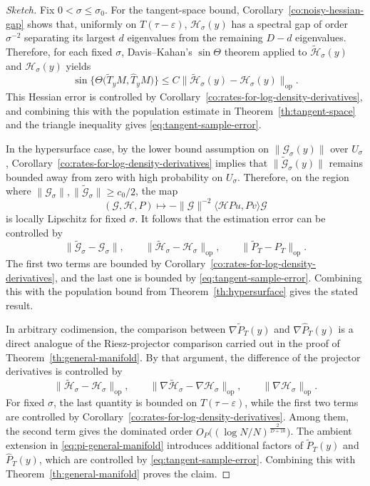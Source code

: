 \documentclass[11pt]{article}
\theoremstyle{plain}
\theoremstyle{definition}
\begin{document}
\begin{proof}[Sketch]
Fix $0<\sigma\le \sigma_0$. For the tangent-space bound, Corollary~\ref{co:noisy-hessian-gap} shows that, uniformly on $T(\tau-\varepsilon)$, $\mathcal H_\sigma(y)$ has a spectral gap of order $\sigma^{-2}$ separating its largest $d$ eigenvalues from the remaining $D-d$ eigenvalues. Therefore, for each fixed $\sigma$, Davis--Kahan's $\sin\Theta$ theorem applied to $\widetilde{\mathcal H}_\sigma(y)$ and $\mathcal H_\sigma(y)$ yields
\[
\sin\{ \Theta\big(\widetilde T_yM, \widehat T_yM\big)\}
\le
C\|\widetilde{\mathcal H}_\sigma(y)-\mathcal H_\sigma(y)\|_{\mathrm{op}}.
\]
This Hessian error is controlled by Corollary~\ref{co:rates-for-log-density-derivatives}, and combining this with the population estimate in Theorem~\ref{th:tangent-space} and the triangle inequality gives \eqref{eq:tangent-sample-error}.

In the hypersurface case, by the lower bound assumption on $\|\mathcal G_\sigma(y)\|$ over $U_\sigma$, Corollary~\ref{co:rates-for-log-density-derivatives} implies that $\|\widetilde{\mathcal G}_\sigma(y)\|$ remains bounded away from zero with high probability on $U_\sigma$. 
Therefore, on the region where $\|\mathcal G_\sigma\|,\|\widetilde{\mathcal G}_\sigma\|\ge c_0/2$,
the map 
\[
(\mathcal G,\mathcal H,P)\mapsto -\|\mathcal G\|^{-2} \langle \mathcal HPu,Pv\rangle \mathcal G
\]
is locally Lipschitz for fixed $\sigma$. It follows that the estimation error can be controlled by 
\[
\|\widetilde{\mathcal G}_\sigma-\mathcal G_\sigma\|,
\qquad
\|\widetilde{\mathcal H}_\sigma-\mathcal H_\sigma\|_{\mathrm{op}},
\qquad
\|\widetilde P_T-P_T\|_{\mathrm{op}}.
\]
The first two terms are bounded by Corollary~\ref{co:rates-for-log-density-derivatives}, and the last one is bounded by \eqref{eq:tangent-sample-error}. Combining this with the population bound from Theorem~\ref{th:hypersurface} gives the stated result.


In arbitrary codimension, the comparison between $\nabla \widetilde P_T(y)$ and $\nabla \widehat P_T(y)$ is a direct analogue of the Riesz-projector comparison carried out in the proof of Theorem~\ref{th:general-manifold}. By that argument, the difference of the projector derivatives is controlled by
\[
\|\widetilde{\mathcal H}_\sigma-\mathcal H_\sigma\|_{\mathrm{op}},
\qquad
\|\nabla \widetilde{\mathcal H}_\sigma-\nabla \mathcal H_\sigma\|_{\mathrm{op}},
\qquad
\|\nabla \mathcal H_\sigma\|_{\mathrm{op}}.
\]
For fixed $\sigma$, the last quantity is bounded on $T(\tau-\varepsilon)$, while the first two terms are controlled by Corollary~\ref{co:rates-for-log-density-derivatives}. Among them, the second term gives the dominated order $O_P\big(({\log N}/{N})^{\frac{2}{D+10}}\big)$. The ambient extension in \eqref{eq:pi-general-manifold} introduces additional factors of $\widetilde P_T(y)$ and $\widehat P_T(y)$, which are controlled by \eqref{eq:tangent-sample-error}. Combining this with Theorem~\ref{th:general-manifold} proves the claim.

\end{proof}
\end{document}
